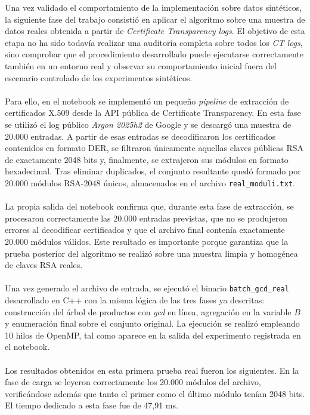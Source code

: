 Una vez validado el comportamiento de la implementación sobre datos sintéticos, la siguiente fase del trabajo consistió en aplicar el algoritmo sobre una muestra de datos reales obtenida a partir de \textit{Certificate Transparency logs}. El objetivo de esta etapa no ha sido todavía realizar una auditoría completa sobre todos los \textit{CT logs}, sino comprobar que el procedimiento desarrollado puede ejecutarse correctamente también en un entorno real y observar su comportamiento inicial fuera del escenario controlado de los experimentos sintéticos.
\\
\\
Para ello, en el notebook se implementó un pequeño \textit{pipeline} de extracción de certificados X.509 desde la API pública de Certificate Transparency. En esta fase se utilizó el log público \textit{Argon 2025h2} de Google y se descargó una muestra de 20.000 entradas. A partir de esas entradas se decodificaron los certificados contenidos en formato DER, se filtraron únicamente aquellas claves públicas RSA de exactamente 2048 bits y, finalmente, se extrajeron sus módulos en formato hexadecimal. Tras eliminar duplicados, el conjunto resultante quedó formado por 20.000 módulos RSA-2048 únicos, almacenados en el archivo \texttt{real\_moduli.txt}.
\\
\\
La propia salida del notebook confirma que, durante esta fase de extracción, se procesaron correctamente las 20.000 entradas previstas, que no se produjeron errores al decodificar certificados y que el archivo final contenía exactamente 20.000 módulos válidos. Este resultado es importante porque garantiza que la prueba posterior del algoritmo se realizó sobre una muestra limpia y homogénea de claves RSA reales.
\\
\\
Una vez generado el archivo de entrada, se ejecutó el binario \texttt{batch\_gcd\_real} desarrollado en C++ con la misma lógica de las tres fases ya descritas: construcción del árbol de productos con \textit{gcd} en línea, agregación en la variable \(B\) y enumeración final sobre el conjunto original. La ejecución se realizó empleando 10 hilos de OpenMP, tal como aparece en la salida del experimento registrada en el notebook.
\\
\\
Los resultados obtenidos en esta primera prueba real fueron los siguientes. En la fase de carga se leyeron correctamente los 20.000 módulos del archivo, verificándose además que tanto el primer como el último módulo tenían 2048 bits. El tiempo dedicado a esta fase fue de 47,91 ms.
